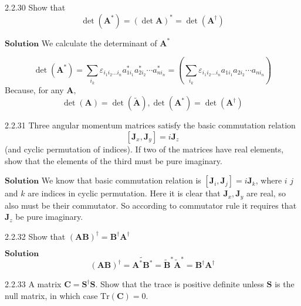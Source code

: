 \documentclass{article}
\begin{document}
\begin{flushleft}
\begin{mybox}{2.2.30}
Show that
$$
\operatorname{det}\left(\mathbf{A}^{*}\right)=(\operatorname{det} \mathbf{A})^{*}=\operatorname{det}\left(\mathbf{A}^{\dagger}\right)
$$
\end{mybox}


$\boxed{\textbf{Solution}}$  We calculate the determinant of $\mathbf{A}^{*}$

$$\operatorname{det}\left(\mathbf{A}^{*}\right)=\sum_{i_{k}} \varepsilon_{i_{1} i_{2} \ldots i_{n}} a_{1 i_{1}}^{*} a_{2 i_{2}}^{*} \cdots a_{n i_{n}}^{*}=\left(\sum_{i_{k}} \varepsilon_{i_{1} i_{2} \ldots i_{n}} a_{1 i_{1}} a_{2 i_{2}} \cdots a_{n i_{n}}\right)$$
Because, for any $\mathbf{A},$ 
$$\operatorname{det}(\mathbf{A})=\operatorname{det}(\tilde{\mathbf{A}}), \operatorname{det}\left(\mathbf{A}^{*}\right)=\operatorname{det}\left(\mathbf{A}^{\dagger}\right)$$



\begin{mybox}{2.2.31}
Three angular momentum matrices satisfy the basic commutation relation
$$[\mathbf{J}_x, \mathbf{J}_y] = i\mathbf{J}_z$$
(and cyclic permutation of indices). If two of the matrices have real elements, show that
the elements of the third must be pure imaginary.
\end{mybox}

$\boxed{\textbf{Solution}}$ We know that basic commutation relation is $\left[\mathbf{J}_{i}, \mathbf{J}_{j}\right]=i \mathbf{J}_{k}$, where $i$ $j$ and $k$ are indices in cyclic permutation.
Here it is clear that $\mathbf{J}_{x}, \mathbf{J}_{y}$ are real, so also must be their commutator. So according to
commutator rule it requires that $\mathbf{J}_{z}$ be pure imaginary.



\begin{mybox}{2.2.32}
Show that $(\mathbf{A}\mathbf{B})^{\dagger}=\mathbf{B}^{\dagger} \mathbf{A}^{\dagger}$
\end{mybox}



$\boxed{\textbf{Solution}}$ 
$$(\mathbf{A}\mathbf{B})^{\dagger}=\widetilde{\mathbf{A}^{*} \mathbf{B}^{*}}=\tilde{\mathbf{B}}^{*} \tilde{\mathbf{A}}^{*}=\mathbf{B}^{\dagger} \mathbf{A}^{\dagger}$$



\begin{mybox}{2.2.33}
A matrix $\mathbf{C}=\mathbf{S}^{\dagger} \mathbf{S}$. Show that the trace is positive definite unless $\mathbf{S}$ is the null matrix, in which case $\text{Tr}(\mathbf{C})=0 .$
\end{mybox}




\end{flushleft}
\end{document}
